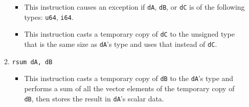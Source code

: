 \documentclass{article}
\begin{document}
\begin{itemize}
\begin{enumerate}
\begin{itemize}
				\item This instruction causes an exception if \texttt{dA},
				\texttt{dB}, or \texttt{dC} is of the following types:
				\texttt{u64}, \texttt{i64}.

				\item This instruction casts a temporary copy of
				\texttt{dC} to the unsigned type that is the same size as
				\texttt{dA}'s type and uses that instead of \texttt{dC}.
				\end{itemize}




			\item \texttt{rsum dA, dB}
				\begin{itemize}
				\item This instruction casts a temporary copy of
				\texttt{dB} to the \texttt{dA}'s type and performs a sum of
				all the vector elements of the temporary copy of
				\texttt{dB}, then stores the result in \texttt{dA}'s scalar
				data.


\end{itemize}
\end{enumerate}
\end{itemize}
\end{document}
